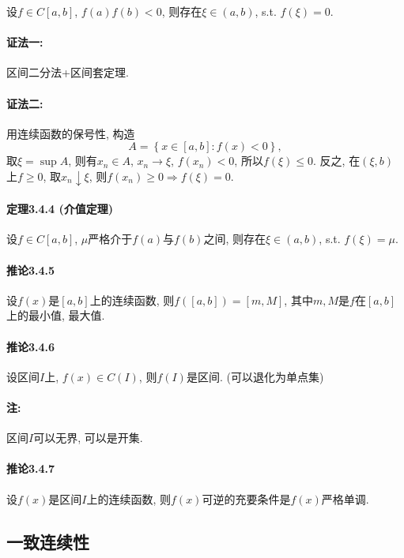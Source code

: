 设$f\in C[a,b]$, $f(a)f(b)<0$, 则存在$\xi\in\left(a,b\right)$, s.t.
$f(\xi)=0$.

\paragraph{证法一:}

区间二分法+区间套定理.

\paragraph{证法二:}

用连续函数的保号性, 构造
\[
A=\left\{ x\in[a,b]:f(x)<0\right\} ,
\]
取$\xi=\sup A$, 则有$x_{n}\in A$, $x_{n}\to\xi$, $f(x_{n})<0$, 所以$f(\xi)\le0$.
反之, 在$(\xi,b)$上$f\ge0$, 取$x_{n}\downarrow\xi$, 则$f(x_{n})\ge0\Longrightarrow f(\xi)=0$.

\paragraph{定理3.4.4 (介值定理)}

设$f\in C[a,b]$, $\mu$严格介于$f(a)$与$f(b)$之间, 则存在$\xi\in(a,b)$, s.t.
$f(\xi)=\mu$.

\paragraph{推论3.4.5}

设$f(x)$是$[a,b]$上的连续函数, 则$f([a,b])=[m,M]$, 其中$m,M$是$f$在$[a,b]$上的最小值,
最大值.

\paragraph{推论3.4.6}

设区间$I$上, $f(x)\in C(I)$, 则$f(I)$是区间. (可以退化为单点集)

\paragraph{注: }

区间$I$可以无界, 可以是开集.

\paragraph{推论3.4.7}

设$f(x)$是区间$I$上的连续函数, 则$f(x)$可逆的充要条件是$f(x)$严格单调.

\subsection{一致连续性}

